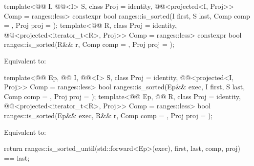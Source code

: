 %
\begin{itemdecl}
template<@@ I, @@<I> S, class Proj = identity,
         @@<projected<I, Proj>> Comp = ranges::less>
  constexpr bool ranges::is_sorted(I first, S last, Comp comp = {}, Proj proj = {});
template<@@ R, class Proj = identity,
         @@<projected<iterator_t<R>, Proj>> Comp = ranges::less>
  constexpr bool ranges::is_sorted(R&& r, Comp comp = {}, Proj proj = {});
\end{itemdecl}

\begin{itemdescr}
\pnum
\effects
Equivalent to:
\end{itemdescr}

\begin{itemdecl}
template<@@ Ep, @@ I, @@<I> S,
         class Proj = identity,
         @@<projected<I, Proj>> Comp = ranges::less>
  bool ranges::is_sorted(Ep&& exec, I first, S last, Comp comp = {}, Proj proj = {});
template<@@ Ep, @@ R, class Proj = identity,
         @@<projected<iterator_t<R>, Proj>> Comp = ranges::less>
  bool ranges::is_sorted(Ep&& exec, R&& r, Comp comp = {}, Proj proj = {});
\end{itemdecl}

\begin{itemdescr}
\pnum
\effects
Equivalent to:
\begin{codeblock}
return ranges::is_sorted_until(std::forward<Ep>(exec), first, last, comp, proj) == last;
\end{codeblock}
\end{itemdescr}

